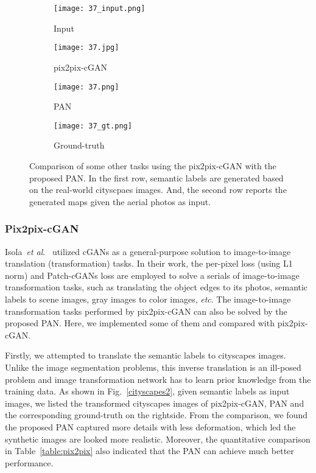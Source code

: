 \documentclass{article}
\newcommand{\etal}{\textit{et al}.}
\newcommand{\etc}{\textit{etc}}
\begin{document}
\begin{figure*}[!t]
 \begin{subfigure}[b]{0.22\textwidth}
    \texttt{[image: 37\_input.png]}
    \caption{Input}
    \label{fig_first_case}
\end{subfigure}
 \begin{subfigure}[b]{0.22\textwidth}
    \texttt{[image: 37.jpg]}
    \caption{pix2pix-cGAN}
    \label{fig_first_case}
\end{subfigure}
 \begin{subfigure}[b]{0.22\textwidth}
    \texttt{[image: 37.png]}
    \caption{PAN}
    \label{fig_first_case}
\end{subfigure}
 \begin{subfigure}[b]{0.22\textwidth}
    \texttt{[image: 37\_gt.png]}
    \caption{Ground-truth}
    \label{fig_first_case}
\end{subfigure}
\caption{Comparison of some other tasks using the pix2pix-cGAN with the proposed PAN. In the first row, semantic labels are generated based on the real-world cityscpaes images. And, the second row reports the generated maps given the aerial photos as input.}
\label{maps}
\end{figure*}

\subsubsection{Pix2pix-cGAN}

Isola~\etal~\cite{isola2016image} utilized cGANs as a general-purpose solution to image-to-image translation (transformation) tasks. In their work, the per-pixel loss (using L1 norm) and Patch-cGANs loss are employed to solve a serials of image-to-image transformation tasks, such as translating the object edges to its photos, semantic labels to scene images, gray images to color images, \etc. The image-to-image transformation tasks performed by pix2pix-cGAN can also be solved by the proposed PAN. Here, we implemented some of them and compared with pix2pix-cGAN. 

Firstly, we attempted to translate the semantic labels to cityscapes images. 
Unlike the image segmentation problems, this inverse translation is an ill-posed problem and image transformation network has to learn prior knowledge from the training data. As shown in Fig.~\ref{cityscapes2}, given semantic labels as input images, we listed the transformed cityscapes images of pix2pix-cGAN, PAN and the corresponding ground-truth on the rightside. From the comparison, we found the proposed PAN captured more details with less deformation, which led the synthetic images are looked more realistic. Moreover, the quantitative comparison in Table~\ref{table:pix2pix} also indicated that the PAN can achieve much better performance.
\end{document}

